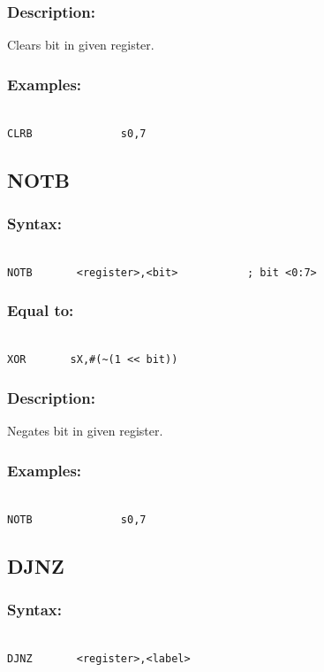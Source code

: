         \subsubsection{Description:}
            Clears bit in given register.

        \subsubsection{Examples:}
        {
            ~\\
            \usecodefont
            \verb'CLRB              s0,7'\\
        }

    \subsection{NOTB}
        \subsubsection{Syntax:}
        {
            ~\\
            \usecodefont
            \verb'NOTB       <register>,<bit>           ; bit <0:7>'
        }
        \subsubsection{Equal to:}
        {
            ~\\
            \usecodefont
            \verb'XOR       sX,#(~(1 << bit))'
        }
        \subsubsection{Description:}
            Negates bit in given register.

        \subsubsection{Examples:}
        {
            ~\\
            \usecodefont
            \verb'NOTB              s0,7'\\
        }

    \subsection{DJNZ}
        \subsubsection{Syntax:}
        {
            ~\\
            \usecodefont
            \verb'DJNZ       <register>,<label>'
        }
